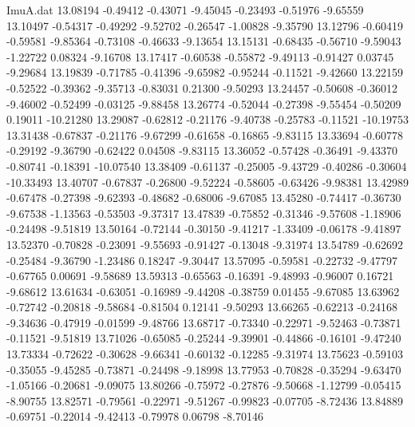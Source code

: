 \begin{filecontents}{ImuA.dat}
  13.08194   -0.49412   -0.43071   -9.45045   -0.23493   -0.51976   -9.65559
  13.10497   -0.54317   -0.49292   -9.52702   -0.26547   -1.00828   -9.35790
  13.12796   -0.60419   -0.59581   -9.85364   -0.73108   -0.46633   -9.13654
  13.15131   -0.68435   -0.56710   -9.59043   -1.22722    0.08324   -9.16708
  13.17417   -0.60538   -0.55872   -9.49113   -0.91427    0.03745   -9.29684
  13.19839   -0.71785   -0.41396   -9.65982   -0.95244   -0.11521   -9.42660
  13.22159   -0.52522   -0.39362   -9.35713   -0.83031    0.21300   -9.50293
  13.24457   -0.50608   -0.36012   -9.46002   -0.52499   -0.03125   -9.88458
  13.26774   -0.52044   -0.27398   -9.55454   -0.50209    0.19011  -10.21280
  13.29087   -0.62812   -0.21176   -9.40738   -0.25783   -0.11521  -10.19753
  13.31438   -0.67837   -0.21176   -9.67299   -0.61658   -0.16865   -9.83115
  13.33694   -0.60778   -0.29192   -9.36790   -0.62422    0.04508   -9.83115
  13.36052   -0.57428   -0.36491   -9.43370   -0.80741   -0.18391  -10.07540
  13.38409   -0.61137   -0.25005   -9.43729   -0.40286   -0.30604  -10.33493
  13.40707   -0.67837   -0.26800   -9.52224   -0.58605   -0.63426   -9.98381
  13.42989   -0.67478   -0.27398   -9.62393   -0.48682   -0.68006   -9.67085
  13.45280   -0.74417   -0.36730   -9.67538   -1.13563   -0.53503   -9.37317
  13.47839   -0.75852   -0.31346   -9.57608   -1.18906   -0.24498   -9.51819
  13.50164   -0.72144   -0.30150   -9.41217   -1.33409   -0.06178   -9.41897
  13.52370   -0.70828   -0.23091   -9.55693   -0.91427   -0.13048   -9.31974
  13.54789   -0.62692   -0.25484   -9.36790   -1.23486    0.18247   -9.30447
  13.57095   -0.59581   -0.22732   -9.47797   -0.67765    0.00691   -9.58689
  13.59313   -0.65563   -0.16391   -9.48993   -0.96007    0.16721   -9.68612
  13.61634   -0.63051   -0.16989   -9.44208   -0.38759    0.01455   -9.67085
  13.63962   -0.72742   -0.20818   -9.58684   -0.81504    0.12141   -9.50293
  13.66265   -0.62213   -0.24168   -9.34636   -0.47919   -0.01599   -9.48766
  13.68717   -0.73340   -0.22971   -9.52463   -0.73871   -0.11521   -9.51819
  13.71026   -0.65085   -0.25244   -9.39901   -0.44866   -0.16101   -9.47240
  13.73334   -0.72622   -0.30628   -9.66341   -0.60132   -0.12285   -9.31974
  13.75623   -0.59103   -0.35055   -9.45285   -0.73871   -0.24498   -9.18998
  13.77953   -0.70828   -0.35294   -9.63470   -1.05166   -0.20681   -9.09075
  13.80266   -0.75972   -0.27876   -9.50668   -1.12799   -0.05415   -8.90755
  13.82571   -0.79561   -0.22971   -9.51267   -0.99823   -0.07705   -8.72436
  13.84889   -0.69751   -0.22014   -9.42413   -0.79978    0.06798   -8.70146

\end{filecontents}
